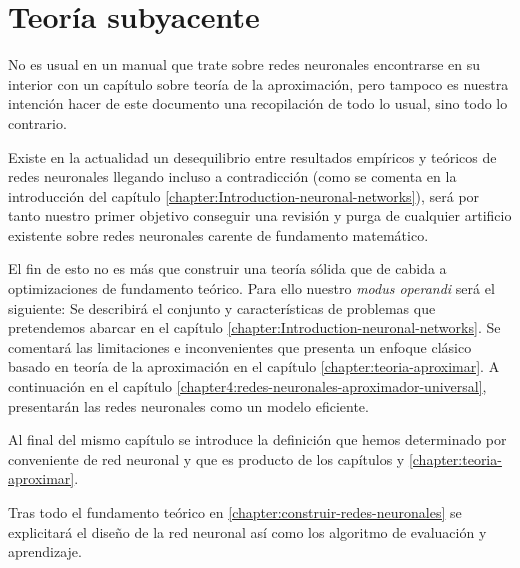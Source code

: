 
\part{Teoría subyacente}

No es usual en un manual que trate sobre redes neuronales encontrarse en su interior con un 
capítulo sobre teoría de la aproximación, pero tampoco es nuestra intención
hacer de este documento una recopilación de todo lo usual, sino todo lo contrario.

Existe en la actualidad un desequilibrio entre resultados empíricos y teóricos de redes neuronales llegando incluso a contradicción (como se comenta en la introducción del capítulo \ref{chapter:Introduction-neuronal-networks}), será por tanto
nuestro primer objetivo conseguir una revisión y purga de cualquier artificio existente sobre redes neuronales carente de fundamento matemático. 

El fin de esto no es más que construir una teoría sólida que de cabida a optimizaciones de 
fundamento teórico.  Para ello nuestro \textit{modus operandi} será el siguiente: 
Se describirá el conjunto y características de problemas que pretendemos abarcar  en el capítulo \ref{chapter:Introduction-neuronal-networks}. 
Se comentará las limitaciones e inconvenientes que presenta un enfoque clásico 
basado en teoría de la aproximación en el capítulo \ref{chapter:teoria-aproximar}.
A continuación en el capítulo \ref{chapter4:redes-neuronales-aproximador-universal}, 
presentarán las redes neuronales como un modelo eficiente.
 
Al final del mismo capítulo se introduce la definición que hemos determinado por conveniente de red neuronal y que es producto de los capítulos 
y \ref{chapter:teoria-aproximar}.
 
Tras todo el fundamento teórico en \ref{chapter:construir-redes-neuronales} se explicitará el diseño de la red neuronal así como los algoritmo de evaluación y aprendizaje.